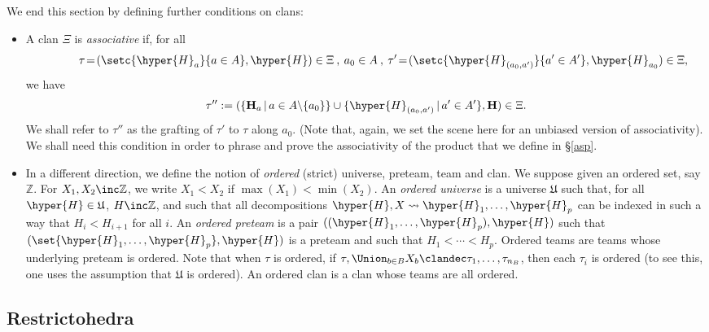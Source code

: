  
 We end this section by defining  further conditions on clans:
 \begin{itemize}
 \item  A clan  $\Xi$ is  {\em associative} if,
for all $$\quad\quad\quad\tau \!=\! (\setc{\hyper{H}_a}{a\in A},\hyper{H})\in \Xi\:,\:a_0\in A\: ,\:
\tau' \!=\! (\setc{\hyper{H}_{(a_0,a')}}{a'\in A'},\hyper{H}_{a_0}) \in\Xi,$$ we have
$$\tau'':=(\{{\bf H}_{a}\,|\,a\in A\backslash \{a_0\}\}\cup \{\hyper{H}_{(a_0,a')}\,|\,a'\in A'\},{\bf H})\in\Xi.$$ We shall refer to  $\tau''$ as the grafting of $\tau'$ to  $\tau$ along $a_0$.   (Note that, again, we set the scene here for an unbiased version of associativity). We shall need this condition in order to phrase and prove the associativity of the product that we define in \S\ref{asp}.
\item In a different direction, we define the notion of {\em ordered} (strict) universe, preteam, team and clan. We suppose given an ordered set, say $\mathbb{Z}$. For $X_1,X_2\inc\mathbb{Z}$, we write $X_1<X_2$ if $\max(X_1)<\min(X_2)$.  An \emph{ordered universe} is a universe $\mathfrak{U}$ such that, for all $\hyper{H}\in\mathfrak{U}$, $H\inc\mathbb{Z}$,  and such that  all decompositions 
$\hyper{H},X\leadsto \hyper{H}_1,\ldots,\hyper{H}_p$ can be indexed in such a way that $H_i<H_{i+1}$ for all $i$.  An \emph{ordered preteam} is a pair $((\hyper{H}_1,\ldots,\hyper{H}_p),\hyper{H})$ such that $(\set{\hyper{H}_1,\ldots,\hyper{H}_p},\hyper{H})$ is a preteam and such that $H_1<\cdots<H_p$. Ordered teams are teams whose underlying preteam is ordered. Note that when $\tau$ is ordered, if $\tau,\Union_{b\in B}X_b\clandec \tau_1,\ldots,\tau_{n_B}$, then each $\tau_i$  is ordered (to see this, one uses the assumption that $\mathfrak{U}$ is ordered).
An ordered clan is a clan whose teams are all ordered. 
\end{itemize}



\subsection{Restrictohedra} \label{restrictohedra-section}

